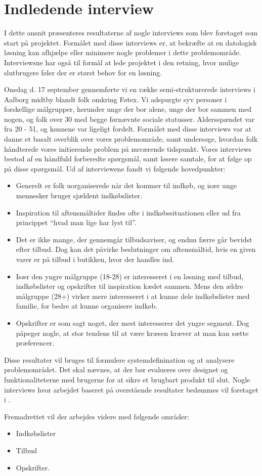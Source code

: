 \section{Indledende interview}\label{section:interview1}
I dette ansnit præsenteres resultaterne af nogle interviews som blev foretaget som start på projektet.
Formålet med disse interviews er, at bekræfte at en datologisk løsning kan afhjælpe eller minimere nogle problemer i dette problemområde.
Interviewsne har også til formål at lede projektet i den retning, hvor mulige slutbrugere føler der er størst behov for en løsning.


Onsdag d. 17 september gennemførte vi en række semi-strukturerede interviews i Aalborg midtby blandt folk omkring Føtex.
Vi adspurgte syv personer i forskellige målgrupper, herunder unge der bor alene, unge der bor sammen med nogen, og  folk over 30 med begge førnævnte sociale statusser.
Aldersspændet var fra 20 - 51, og kønnene var ligeligt fordelt.
Formålet med disse interviews var at danne et basalt overblik over vores problemområde, samt undersøge, hvordan folk håndterede vores initierende problem på nuværende tidspunkt.
Vores interviews bestod af en håndfuld forberedte spørgsmål, samt løsere samtale, for at følge op på disse spørgsmål.
Ud af interviewene fandt vi følgende hovedpunkter:
\begin{itemize}
	\item Generelt er folk uorganiserede når det kommer til indkøb, og især unge mennesker bruger sjældent indkøbslister.
	\item Inspiration til aftensmåltider findes ofte i indkøbssituationen eller ud fra princippet “hvad man lige har lyst til”.
	\item Det er ikke mange, der gennemgår tilbudsaviser, og endnu færre går bevidst efter tilbud.
	Dog kan det påvirke beslutninger om aftensmåltid, hvis en given varer er på tilbud i butikken, hvor der handles ind.
	\item Især den yngre målgruppe (18-28) er interesseret i en løsning med tilbud, indkøbslister og opskrifter til inspiration kædet sammen. Mens den ældre målgruppe (28+) virker mere interesseret i at kunne dele indkøbslister med familie, for bedre at kunne organisere indkøb.
	\item Opskrifter er som sagt noget, der mest interesserer det yngre segment.
	Dog påpeger nogle, at stor tendens til at være kræsen kræver at man kan sætte præferencer.
\end{itemize}


Disse resultater vil bruges til formulere systemdefinination og at analysere problemområdet.
Det skal nævnes, at der bør evalueres over designet og funktionaliteterne med brugerne for at sikre et brugbart produkt til slut.
Nogle interviews hvor arbejdet baseret på overstående resultater bedømmes vil foretaget  i .

Fremadrettet vil der arbejdes videre med følgende områder:

\begin{itemize}
	\item Indkøbslister
	\item Tilbud
	\item Opskrifter.
\end{itemize}
